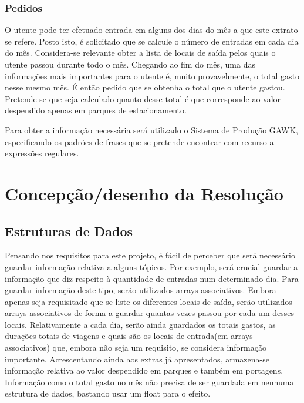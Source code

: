 \documentclass{report}
\begin{document}
\subsection{Pedidos}
O utente pode ter efetuado entrada em alguns dos dias do mês a que este extrato se refere. 
Posto isto, é solicitado que se calcule o número de entradas em cada dia do mês.
Considera-se relevante obter a lista de locais de saída pelos quais o utente passou durante todo o mês.
Chegando ao fim do mês, uma das informações mais importantes para o utente é, muito provavelmente, o total gasto nesse mesmo mês. 
É então pedido que se obtenha o total que o utente gastou. Pretende-se que seja calculado quanto desse total é que corresponde 
ao valor despendido apenas em parques de estacionamento.\par
Para obter a informação necessária será utilizado o Sistema de Produção GAWK, especificando os padrões de frases que se pretende encontrar com recurso a expressões regulares.

\chapter{Concepção/desenho da Resolução} \label{cd}
\section{Estruturas de Dados}
Pensando nos requisitos para este projeto, é fácil de perceber que será necessário 
guardar informação relativa a alguns tópicos. Por exemplo, será crucial guardar a informação que diz respeito 
à quantidade de entradas num determinado dia. Para guardar informação deste tipo, serão utilizados arrays associativos. 
Embora apenas seja requisitado que se liste os diferentes locais de saída, serão utilizados arrays associativos de 
forma a guardar quantas vezes passou por cada um desses locais. Relativamente a cada dia, serão ainda guardados os 
totais gastos, as durações totais de viagens e quais são os locais de entrada(em arrays associativos) que, embora não seja um 
requisito, se considera informação importante.
Acrescentando ainda aos extras já apresentados, armazena-se informação relativa ao valor despendido em parques e também em portagens. 
Informação como o total gasto no mês não precisa de ser guardada em nenhuma estrutura de dados, bastando usar um float para o efeito.
\end{document}
